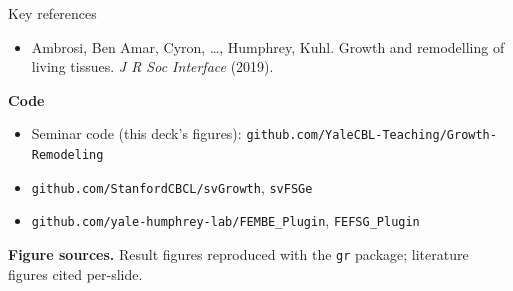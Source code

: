 \begin{frame}[t,allowframebreaks]{Key references}
\begin{itemize}
    arterial mechanics. \textit{J Biomech} (2009).
    \item Ambrosi, Ben Amar, Cyron, \ldots, Humphrey, Kuhl. Growth and remodelling
    of living tissues. \textit{J R Soc Interface} (2019).
  \end{itemize}
  \framebreak
  \small
  \textbf{Code}
  \begin{itemize}
    \item Seminar code (this deck's figures): \texttt{github.com/YaleCBL-Teaching/Growth-Remodeling}
    \item \texttt{github.com/StanfordCBCL/svGrowth}, \texttt{svFSGe}
    \item \texttt{github.com/yale-humphrey-lab/FEMBE\_Plugin}, \texttt{FEFSG\_Plugin}
  \end{itemize}
  \vspace{0.6em}
  \textbf{Figure sources.} Result figures reproduced with the \texttt{gr} package;
  literature figures cited per-slide.
\end{frame}

